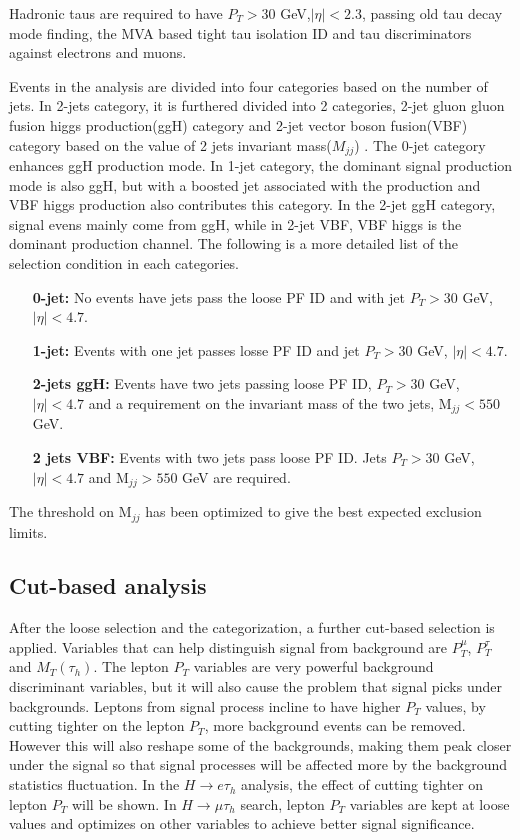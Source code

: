 Hadronic taus are required to have $P_T>30$ GeV,$|\eta|<2.3$, passing old tau decay mode finding, the MVA based tight tau isolation ID and tau discriminators against electrons and muons. %


Events in the analysis are divided into four categories based on the number of jets. In 2-jets category, it is furthered divided into 2 categories,  2-jet gluon gluon fusion higgs production(ggH) category and 2-jet vector boson fusion(VBF) category based on the value of 2 jets invariant mass($M_{jj}$) . The 0-jet category enhances ggH production mode. In 1-jet category, the dominant signal production mode is also ggH, but with a boosted jet associated with the production and VBF higgs production also contributes this category. In the 2-jet ggH category, signal evens mainly come from ggH, while in 2-jet VBF, VBF higgs is the dominant production channel.  The following is a more detailed list of the selection condition in each categories.

\begin{enumerate}
\item[{\bf 0-jet:}] No events have jets pass the loose PF ID and  with jet $P_T>30$ GeV, $|\eta|<4.7$.
\item[{\bf 1-jet:}] Events with one jet passes losse PF ID and jet $P_T>30$ GeV, $|\eta|<4.7$.
\item [{\bf 2-jets ggH:}] Events have two jets passing loose PF ID, $P_T>30$ GeV, $|\eta|<4.7$ and a requirement on the invariant mass of the two jets, $\textrm{M}_{jj}<550$ GeV. 
\item [{\bf 2 jets VBF:}] Events with two jets pass loose PF ID. Jets $P_T>30$ GeV, $|\eta|<4.7$ and $\textrm{M}_{jj}>550$ GeV are required. 
\end{enumerate} The threshold on $\textrm{M}_{jj}$ has been optimized to give the best expected exclusion limits.


\subsection{Cut-based analysis}
After the loose selection and the categorization, a further cut-based selection is applied. Variables that can help distinguish signal from background are $P_{T}^{\mu}$, $P_{T}^{\tau}$ and $M_{T}(\tau_{h})$. The lepton $P_{T}$ variables are very powerful background discriminant variables, but it will also cause the problem that signal picks under backgrounds. Leptons from signal process  incline to have higher $P_{T}$ values, by cutting tighter on the lepton $P_{T}$, more background events can be removed. However this will also reshape some of the backgrounds, making them peak closer under the signal so that signal processes will be affected more by the background statistics fluctuation. In the $H\rightarrow e\tau_h$ analysis, the effect of cutting tighter on lepton $P_{T}$ will be shown. In $H\rightarrow\mu\tau_h$ search, lepton $P_{T}$ variables are kept at loose values and optimizes on other variables to achieve better signal significance. 

